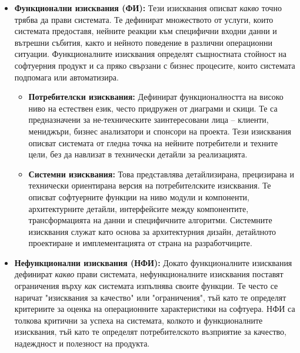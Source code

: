 \documentclass{scrartcl}
\begin{document}
\begin{FlushLeft}
\begin{itemize}
    \item \textbf{Функционални изисквания (ФИ):} Тези изисквания описват \textit{какво} точно трябва да прави системата. Те дефинират множеството от услуги, които системата предоставя, нейните реакции към специфични входни данни и вътрешни събития, както и нейното поведение в различни операционни ситуации. Функционалните изисквания определят същностната стойност на софтуерния продукт и са пряко свързани с бизнес процесите, които системата подпомага или автоматизира.
    
    \begin{itemize}
        \item \textbf{Потребителски изисквания:} Дефинират функционалността на високо ниво на естествен език, често придружен от диаграми и скици. Те са предназначени за не-техническите заинтересовани лица -- клиенти, мениджъри, бизнес анализатори и спонсори на проекта. Тези изисквания описват системата от гледна точка на нейните потребители и техните цели, без да навлизат в технически детайли за реализацията.
        
        \item \textbf{Системни изисквания:} Това представлява детайлизирана, прецизирана и технически ориентирана версия на потребителските изисквания. Те описват софтуерните функции на ниво модули и компоненти, архитектурните детайли, интерфейсите между компонентите, трансформацията на данни и специфичните алгоритми. Системните изисквания служат като основа за архитектурния дизайн, детайлното проектиране и имплементацията от страна на разработчиците.
    \end{itemize}
    
    \item \textbf{Нефункционални изисквания (НФИ):} Докато функционалните изисквания дефинират \textit{какво} прави системата, нефункционалните изисквания поставят ограничения върху \textit{как} системата изпълнява своите функции. Те често се наричат "изисквания за качество" или "ограничения", тъй като те определят критериите за оценка на операционните характеристики на софтуера. НФИ са толкова критични за успеха на системата, колкото и функционалните изисквания, тъй като те определят потребителското възприятие за качество, надеждност и полезност на продукта.
    

\end{itemize}
\end{FlushLeft}
\end{document}
